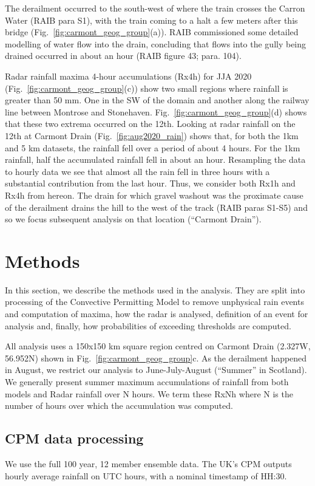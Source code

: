\documentclass[11pt,a4paper]{article}
\begin{document}
The derailment occurred to the south-west of where the train crosses the Carron Water (RAIB para S1), with the train coming to a halt a few meters after this bridge (Fig.~\ref{fig:carmont_geog_group}(a)).  RAIB commissioned some detailed modelling of water flow into the drain, concluding that flows into the gully being drained occurred in about an hour (RAIB figure 43; para. 104). 


Radar rainfall maxima 4-hour accumulations (Rx4h) for JJA 2020 (Fig.~\ref{fig:carmont_geog_group}(c)) show two small regions  where rainfall is greater than 50 mm. One in the SW of the domain and another along the railway line between Montrose and Stonehaven. Fig.~\ref{fig:carmont_geog_group}(d) shows that these two extrema occurred on the 12th. Looking at radar rainfall on the 12th at Carmont Drain (Fig.~\ref{fig:aug2020_rain}) shows that, for both the 1km and 5 km datasets, the rainfall fell over a period of about 4 hours. For the 1km rainfall, half the accumulated rainfall fell in about an hour.  Resampling the data to hourly data we see that almost all the rain fell in three hours with a substantial contribution from the last hour. Thus, we consider both Rx1h and Rx4h from hereon. The drain for which gravel washout was the proximate cause of the derailment drains the hill to the west of the track (RAIB paras S1-S5) and so we focus subsequent analysis on that location (``Carmont Drain'').

\section{Methods}
In this section, we describe the methods used in the analysis. They are split into processing of the Convective Permitting Model to remove unphysical rain events  and computation of maxima, how the radar is analysed, definition of an event for analysis and, finally, how probabilities of exceeding thresholds are computed. 

All analysis uses a 150x150 km square region centred on Carmont Drain (2.327W, 56.952N) shown in Fig.~\ref{fig:carmont_geog_group}c. As the derailment happened in August, we restrict our analysis to June-July-August (``Summer'' in Scotland).  We generally present summer  maximum accumulations of rainfall from both models and Radar rainfall over N hours. We term these RxNh where N is the number of hours over which the accumulation was computed. 

\subsection{CPM data processing}
We use the full 100 year, 12 member ensemble data. The UK's CPM outputs hourly average rainfall on UTC hours, with a nominal timestamp of HH:30. 
\end{document}
